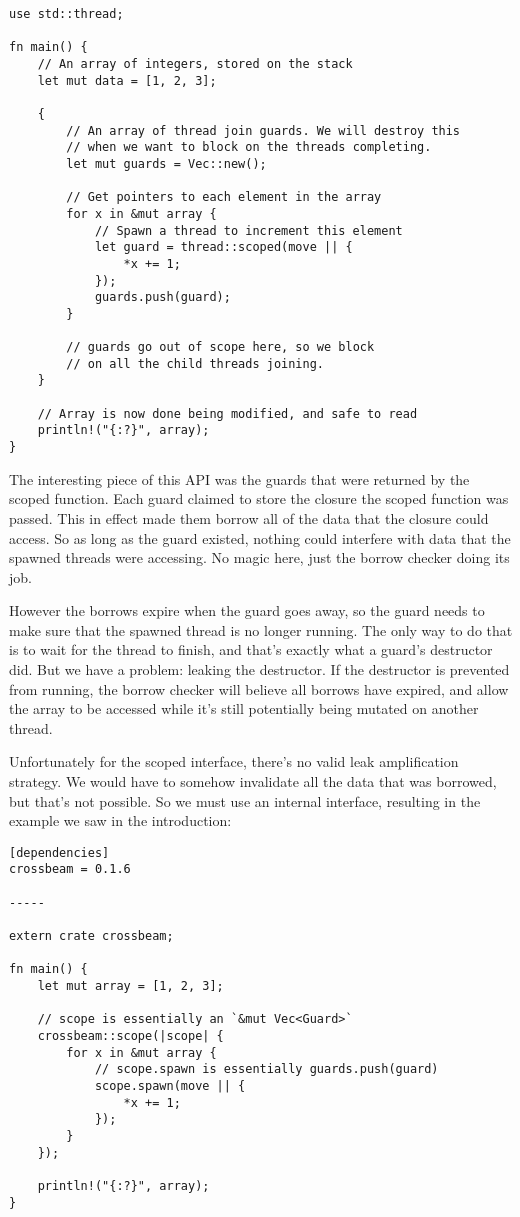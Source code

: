 \begin{verbatim}
use std::thread;

fn main() {
    // An array of integers, stored on the stack
    let mut data = [1, 2, 3];

    {
        // An array of thread join guards. We will destroy this
        // when we want to block on the threads completing.
        let mut guards = Vec::new();

        // Get pointers to each element in the array
        for x in &mut array {
            // Spawn a thread to increment this element
            let guard = thread::scoped(move || {
                *x += 1;
            });
            guards.push(guard);
        }

        // guards go out of scope here, so we block
        // on all the child threads joining.
    }

    // Array is now done being modified, and safe to read
    println!("{:?}", array);
}
\end{verbatim}

The interesting piece of this API was the guards that were returned
by the scoped function. Each guard claimed to store the closure the
scoped function was passed. This in effect made them borrow all of the
data that the closure could access. So as long as the guard existed, nothing
could interfere with data that the spawned threads were accessing. No magic
here, just the borrow checker doing its job.

However the borrows expire when the guard goes away, so the guard needs to
make sure that the spawned thread is no longer running. The only way to do
that is to wait for the thread to finish, and that's exactly what a guard's
destructor did. But we have a problem: leaking the destructor. If the destructor
is prevented from running, the borrow checker will believe all borrows have
expired, and allow the array to be accessed while it's still potentially
being mutated on another thread.

Unfortunately for the scoped interface, there's no valid leak amplification strategy.
We would have to somehow invalidate all the data that was borrowed, but that's
not possible. So we must use an internal interface, resulting in the example
we saw in the introduction:

\begin{verbatim}
[dependencies]
crossbeam = 0.1.6

-----

extern crate crossbeam;

fn main() {
    let mut array = [1, 2, 3];

    // scope is essentially an `&mut Vec<Guard>`
    crossbeam::scope(|scope| {
        for x in &mut array {
            // scope.spawn is essentially guards.push(guard)
            scope.spawn(move || {
                *x += 1;
            });
        }
    });

    println!("{:?}", array);
}
\end{verbatim}

